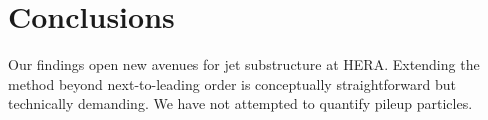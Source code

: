 \section{Conclusions}\label{sec:conclusions}

Our findings open new avenues for jet substructure at HERA. Extending
the method beyond next-to-leading order is conceptually straightforward
but technically demanding. We have not attempted to quantify pileup
particles.

